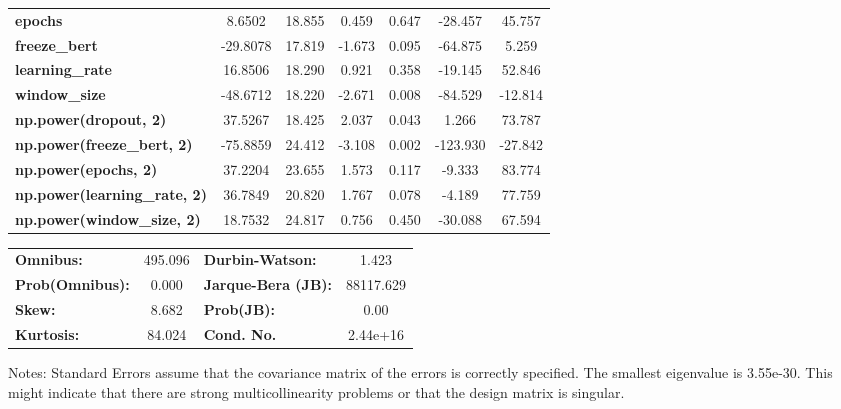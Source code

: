 \begin{center}
\begin{tabular}{lcccccc}
\textbf{epochs}                            &       8.6502  &       18.855     &     0.459  &         0.647        &      -28.457    &       45.757     \\
\textbf{freeze\_bert}                      &     -29.8078  &       17.819     &    -1.673  &         0.095        &      -64.875    &        5.259     \\
\textbf{learning\_rate}                    &      16.8506  &       18.290     &     0.921  &         0.358        &      -19.145    &       52.846     \\
\textbf{window\_size}                      &     -48.6712  &       18.220     &    -2.671  &         0.008        &      -84.529    &      -12.814     \\
\textbf{np.power(dropout, 2)}              &      37.5267  &       18.425     &     2.037  &         0.043        &        1.266    &       73.787     \\
\textbf{np.power(freeze\_bert, 2)}         &     -75.8859  &       24.412     &    -3.108  &         0.002        &     -123.930    &      -27.842     \\
\textbf{np.power(epochs, 2)}               &      37.2204  &       23.655     &     1.573  &         0.117        &       -9.333    &       83.774     \\
\textbf{np.power(learning\_rate, 2)}       &      36.7849  &       20.820     &     1.767  &         0.078        &       -4.189    &       77.759     \\
\textbf{np.power(window\_size, 2)}         &      18.7532  &       24.817     &     0.756  &         0.450        &      -30.088    &       67.594     \\
\bottomrule
\end{tabular}
\begin{tabular}{lclc}
\textbf{Omnibus:}       & 495.096 & \textbf{  Durbin-Watson:     } &     1.423  \\
\textbf{Prob(Omnibus):} &   0.000 & \textbf{  Jarque-Bera (JB):  } & 88117.629  \\
\textbf{Skew:}          &   8.682 & \textbf{  Prob(JB):          } &      0.00  \\
\textbf{Kurtosis:}      &  84.024 & \textbf{  Cond. No.          } &  2.44e+16  \\
\bottomrule
\end{tabular}
\end{center}

Notes: \newline
 [1] Standard Errors assume that the covariance matrix of the errors is correctly specified. \newline
 [2] The smallest eigenvalue is 3.55e-30. This might indicate that there are \newline
 strong multicollinearity problems or that the design matrix is singular.